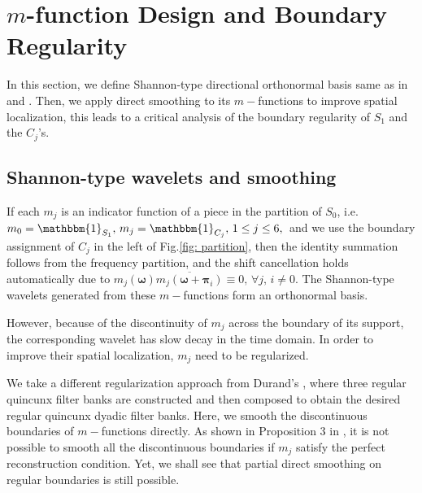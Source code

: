 \section{$m$-function Design and Boundary Regularity}\label{sec: design}
In this section, we define Shannon-type directional orthonormal basis same as in \cite{durand2007} and \cite{nuDFB05}. Then, we apply direct smoothing to its $m-$functions to improve spatial localization, this leads to a critical analysis of the boundary regularity of $S_1$ and the $C_j$'s.

\subsection{Shannon-type wavelets and smoothing}
If each $m_j$ is an indicator function of a piece in the partition of $S_0$, i.e. $m_0 = \mathbbm{1}_{S_1},\, m_j = \mathbbm{1}_{C_j},\,1\leq j \leq 6,\,$ and we use the boundary assignment of $C_j$ in the left of Fig.\ref{fig: partition},
then the identity summation follows from the frequency partition, and the shift cancellation holds automatically due to $m_j(\boldsymbol{\omega})\overline{m_j(\boldsymbol{\omega} + \boldsymbol{\pi}_i)}\equiv 0,\,\forall j,\, i\neq 0.$ %
The Shannon-type wavelets generated from these $m-$functions form an orthonormal basis.

However, because of the discontinuity of $m_j$ across the boundary of its support, the corresponding wavelet has slow decay in the time domain. In order to improve their spatial localization, $m_j$ need to be regularized.

We take a different regularization approach from Durand's \cite{durand2007}, where three regular quincunx filter banks are constructed and then composed to obtain the desired regular quincunx dyadic filter banks. Here, we smooth the discontinuous boundaries of $m-$functions directly. As shown in Proposition 3 in \cite{durand2007}, it is not possible to smooth all the discontinuous boundaries if $m_j$ satisfy the perfect reconstruction condition.
Yet, we shall see that partial direct smoothing on regular boundaries is still possible. %



